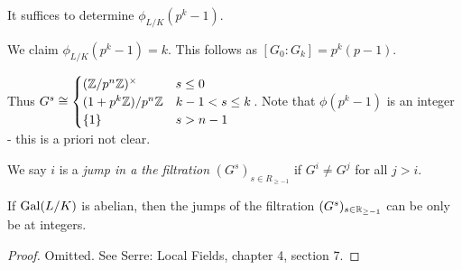 \documentclass[10pt,a4paper]{article}
\begin{document}
It suffices to determine $\phi_{L/K}(p^k-1)$.

We claim $\phi_{L/K}(p^k-1) = k$. This follows as $[G_0:G_k] = p^k(p-1)$.

Thus $G^s \cong \begin{cases} (\mathbb{Z}/p^n\mathbb{Z})^\times & s \leq 0 \\ (1+p^k \mathbb{Z})/p^n\mathbb{Z} & k-1<s\leq k \\ \{1\} & s>n-1\end{cases}$.
Note that $\phi(p^k-1)$ is an integer - this is a priori not clear.

\begin{definition}
  We say $i$ is a \emph{jump in a the filtration} $(G^s)_{s \in R_{\geq-1}}$ if $G^i \neq G^j$ for all $j > i$.
\end{definition}
\begin{theorem}
  If $\operatorname{Gal}(L/K)$ is abelian, then the jumps of the filtration $(G^s)_{s \in \mathbb{R}_{\geq -1}}$ can be only be at integers.
\end{theorem}
\begin{proof}
  Omitted. See Serre: Local Fields, chapter 4, section 7.
\end{proof}
\end{document}
